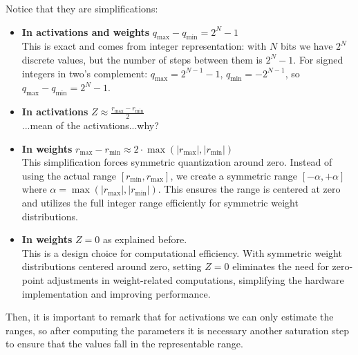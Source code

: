 Notice that they are simplifications:
\begin{itemize}
    \item \textbf{In activations and weights }$q_{\text{max}} - q_{\text{min}} = 2^N-1$\\
    This is exact and comes from integer representation: with $N$ bits we have $2^N$ discrete values, but the number of steps between them is $2^N-1$. For signed integers in two's complement: $q_{\text{max}} = 2^{N-1}-1$, $q_{\text{min}} = -2^{N-1}$, so $q_{\text{max}} - q_{\text{min}} = 2^N-1$.
    
    \item \textbf{In activations }$Z \approx \frac{r_{\text{max}} - r_{\text{min}}}{2}$\\
    ...mean of the activations...why?
    
    \item \textbf{In weights }$r_{\text{max}} - r_{\text{min}} \approx 2 \cdot \operatorname{max}(|r_{\text{max}}|, |r_{\text{min}}|)$\\
    This simplification forces symmetric quantization around zero. Instead of using the actual range $[r_{\text{min}}, r_{\text{max}}]$, we create a symmetric range $[-\alpha, +\alpha]$ where $\alpha = \operatorname{max}(|r_{\text{max}}|, |r_{\text{min}}|)$. This ensures the range is centered at zero and utilizes the full integer range efficiently for symmetric weight distributions.
    
    \item \textbf{In weights }$Z=0$ as explained before.\\
    This is a design choice for computational efficiency. With symmetric weight distributions centered around zero, setting $Z=0$ eliminates the need for zero-point adjustments in weight-related computations, simplifying the hardware implementation and improving performance.
\end{itemize}

Then, it is important to remark that for activations we can only estimate the ranges, so after computing the parameters it is necessary another saturation step to ensure that the values fall in the representable range.

